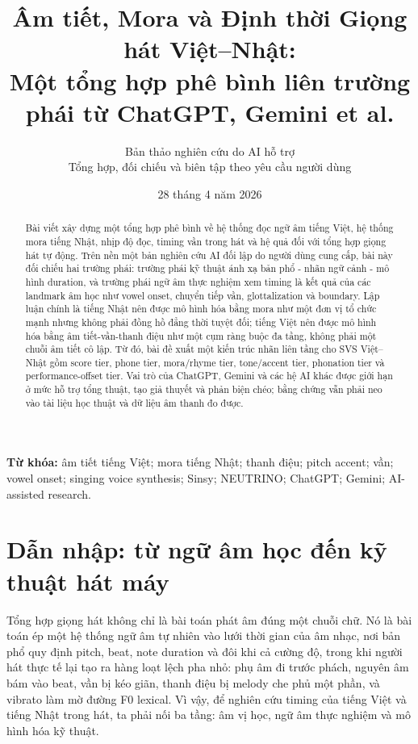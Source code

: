 \documentclass[12pt,a4paper]{article}
\title{\bfseries\sffamily Âm tiết, Mora và Định thời Giọng hát Việt--Nhật:\\Một tổng hợp phê bình liên trường phái từ ChatGPT, Gemini et al.}
\author{Bản thảo nghiên cứu do AI hỗ trợ\\\small Tổng hợp, đối chiếu và biên tập theo yêu cầu người dùng}
\date{28 tháng 4 năm 2026}
\begin{document}
\maketitle

\begin{abstract}
Bài viết xây dựng một tổng hợp phê bình về hệ thống đọc ngữ âm tiếng Việt, hệ thống mora tiếng Nhật, nhịp độ đọc, timing vần trong hát và hệ quả đối với tổng hợp giọng hát tự động. Trên nền một bản nghiên cứu AI đối lập do người dùng cung cấp, bài này đối chiếu hai trường phái: trường phái kỹ thuật ánh xạ bản phổ - nhãn ngữ cảnh - mô hình duration, và trường phái ngữ âm thực nghiệm xem timing là kết quả của các landmark âm học như vowel onset, chuyển tiếp vần, glottalization và boundary. Lập luận chính là tiếng Nhật nên được mô hình hóa bằng mora như một đơn vị tổ chức mạnh nhưng không phải đồng hồ đẳng thời tuyệt đối; tiếng Việt nên được mô hình hóa bằng âm tiết-vần-thanh điệu như một cụm ràng buộc đa tầng, không phải một chuỗi âm tiết cô lập. Từ đó, bài đề xuất một kiến trúc nhãn liên tầng cho SVS Việt--Nhật gồm score tier, phone tier, mora/rhyme tier, tone/accent tier, phonation tier và performance-offset tier. Vai trò của ChatGPT, Gemini và các hệ AI khác được giới hạn ở mức hỗ trợ tổng thuật, tạo giả thuyết và phản biện chéo; bằng chứng vẫn phải neo vào tài liệu học thuật và dữ liệu âm thanh đo được.
\end{abstract}

\noindent\textbf{Từ khóa:} âm tiết tiếng Việt; mora tiếng Nhật; thanh điệu; pitch accent; vần; vowel onset; singing voice synthesis; Sinsy; NEUTRINO; ChatGPT; Gemini; AI-assisted research.

\tableofcontents
\newpage

\section{Dẫn nhập: từ ngữ âm học đến kỹ thuật hát máy}

Tổng hợp giọng hát không chỉ là bài toán phát âm đúng một chuỗi chữ. Nó là bài toán ép một hệ thống ngữ âm tự nhiên vào lưới thời gian của âm nhạc, nơi bản phổ quy định pitch, beat, note duration và đôi khi cả cường độ, trong khi người hát thực tế lại tạo ra hàng loạt lệch pha nhỏ: phụ âm đi trước phách, nguyên âm bám vào beat, vần bị kéo giãn, thanh điệu bị melody che phủ một phần, và vibrato làm mờ đường F0 lexical. Vì vậy, để nghiên cứu timing của tiếng Việt và tiếng Nhật trong hát, ta phải nối ba tầng: âm vị học, ngữ âm thực nghiệm và mô hình hóa kỹ thuật.
\end{document}
